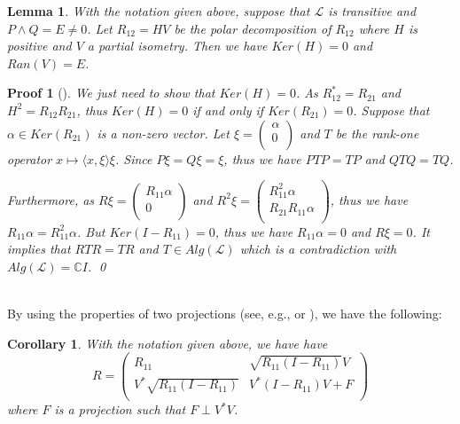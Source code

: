 \documentclass{jaums}
\theoremstyle{thmit} %
\newtheorem{lemma}[theorem]{Lemma}
\newtheorem{corollary}[theorem]{Corollary}
\theoremstyle{thmrm} %
\newtheorem*{oldproof}{Proof}
\renewenvironment{proof}[1][{}]{\begin{oldproof}[#1]}{\qed\end{oldproof}}
\begin{document}
\begin{lemma} With the notation given above, suppose that $\mathcal{L}$ is
transitive and $P\wedge Q=E\neq0$. Let $R_{12}=HV$ be the polar decomposition
of $R_{12}$ where $H$ is positive and $V$ a partial isometry. Then we have
$Ker(H)=0$ and $Ran(V)=E$.
\end{lemma}
\begin{proof} We just need to show that $Ker(H)=0$. As $R_{12}^{*}=R_{21}$ and
$H^{2}=R_{12}R_{21}$, thus $Ker(H)=0$ if and only if $Ker(R_{21})=0$.
Suppose that $\alpha\in Ker(R_{21})$ is a non-zero vector. Let $\xi=\left(
      \begin{array}{c}
        \alpha \\
        0 \\
      \end{array}
    \right)$ and $T$ be the rank-one operator $x\mapsto\langle x,\xi\rangle\xi$.
Since $P\xi=Q\xi=\xi$, thus we have $PTP=TP$ and $QTQ=TQ$.

Furthermore, as $R\xi=\left(
      \begin{array}{c}
        R_{11}\alpha \\
        0 \\
      \end{array}
    \right)$ and $R^2\xi=\left(
      \begin{array}{c}
        R_{11}^2\alpha \\
        R_{21}R_{11}\alpha \\
      \end{array}
    \right)$, thus we have $R_{11}\alpha=R_{11}^{2}\alpha$. But
$Ker(I-R_{11})=0$, thus we have $R_{11}\alpha=0$ and $R\xi=0$.
It implies that $RTR=TR$ and $T\in Alg(\mathcal{L})$ which is a contradiction
with $Alg(\mathcal{L})=\mathbb{C}I$.
\end{proof}\\

By using the properties of two projections (see, e.g., {\cite{[KR]}} or
{\cite{[Ta]}}), we have the following:

\begin{corollary} With the notation given above,  we have have
$$R=\left(
      \begin{array}{cc}
        R_{11} & \sqrt{R_{11}(I-R_{11})}V  \\
        V^{*}\sqrt{R_{11}(I-R_{11})} & V^{*}(I-R_{11})V+F \\
      \end{array}
    \right)$$ where $F$ is a projection such that $F\perp V^{*}V$.
\end{corollary}
\end{document}
